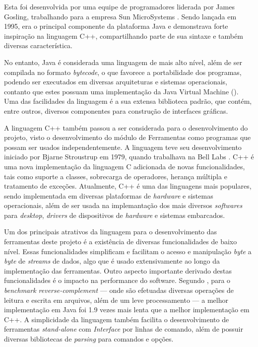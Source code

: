 Esta foi desenvolvida por uma equipe de programadores liderada por James Gosling, trabalhando para a empresa Sun MicroSystems \cite{wikijava}. Sendo lançada em 1995, era o principal componente da plataforma Java e demonstrava forte inspiração na linguagem C++, compartilhando parte de sua sintaxe e também diversas característica.

No entanto, Java é considerada uma linguagem de mais alto nível, além de ser compilada no formato \emph{bytecode}, o que favorece a portabilidade dos programas, podendo ser executados em diversas arquiteturas e sistemas operacionais, contanto que estes possuam uma implementação da Java Virtual Machine (). Uma das facilidades da linguagem é a sua extensa biblioteca padrão, que contém, entre outros, diversos componentes para construção de interfaces gráficas.

A linguagem C++ também passou a ser considerada para o desenvolvimento do projeto, visto o desenvolvimento do módulo de Ferramentas como programas que possam ser usados independentemente.
A linguagem teve seu desenvolvimento iniciado por Bjarne Stroustrup em 1979, quando trabalhava na Bell Labs \cite{wikicplusplus}.
C++ é uma nova implementação da linguagem C adicionada de novas funcionalidades, tais como suporte a classes, sobrecarga de operadores, herança múltipla e tratamento de exceções.
Atualmente, C++ é uma das linguagens mais populares, sendo implementada em diversas plataformas de \emph{hardware} e sistemas operacionais, além de ser usada na implemantação dos mais diversos \emph{softwares} para \emph{desktop}, \emph{drivers} de dispositivos de \emph{hardware} e sistemas embarcados.

Um dos principais atrativos da linguagem para o desenvolvimento das ferramentas deste projeto é a existência de diversas funcionalidades de baixo nível.
Essas funcionalidades simplificam e facilitam o acesso e manipulação \emph{byte} a \emph{byte} de \emph{streams} de dados, algo que é usado extensivamente ao longo da implementação das ferramentas.
Outro aspecto importante derivado destas funcionalidades é o impacto na performance do software. 
Segundo \cite{benchmarks}, para o \emph{benchmark reverse-complement} --- onde são efetuadas diversas operações de leitura e escrita em arquivos, além de um leve processamento --- a melhor implementação em Java foi 1.9 vezes mais lenta que a melhor implementação em C++.
A simplicidade da linguagem também facilita o desenvolvimento de ferramentas \emph{stand-alone} com \emph{Interface} por linhas de comando, além de possuir diversas bibliotecas de \emph{parsing} para comandos e opções.

